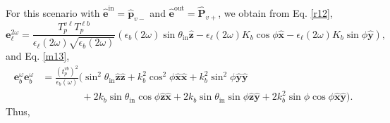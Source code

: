 For this scenario with $\hat{\mathbf{e}}^{\mathrm{in}}=\hat{\mathbf{p}}_{v-}$
and $\hat{\mathbf{e}}^{\mathrm{out}}=\hat{\mathbf{P}}_{v+}$, we obtain from Eq.
\eqref{r12},
\begin{equation*}\label{ri12}
\mathbf{e}^{2\omega}_{\ell} =
\frac{T^{v\ell}_{p}T^{\ell b}_{p}}
     {\epsilon_{\ell}({2\omega})\sqrt{\epsilon_{b}(2\omega)}}
\left(
  \epsilon_{b}(2\omega)\sin\theta_{\mathrm{in}}\hat{\mathbf{z}}
- \epsilon_{\ell}(2\omega)K_{b}\cos\phi\hat{\mathbf{x}}
- \epsilon_{\ell}(2\omega)K_{b}\sin\phi\hat{\mathbf{y}}
\right),
\end{equation*}
and Eq. \eqref{m13},
\begin{equation*}
\begin{split}
\mathbf{e}^{\omega}_{b}\mathbf{e}^{\omega}_{b}
&= \frac{\left(t^{vb}_{p}\right)^{2}}{\epsilon_{b}(\omega)}
\big(
  \sin^{2}\theta_{\mathrm{in}}\hat{\mathbf{z}}\hat{\mathbf{z}}
+ k^{2}_{b}\cos^{2}\phi\hat{\mathbf{x}}\hat{\mathbf{x}}
+ k^{2}_{b}\sin^{2}\phi\hat{\mathbf{y}}\hat{\mathbf{y}}\\
&\qquad\qquad
+ 2k_{b}\sin\theta_{\mathrm{in}}\cos\phi\hat{\mathbf{z}}\hat{\mathbf{x}}
+ 2k_{b}\sin\theta_{\mathrm{in}}\sin\phi\hat{\mathbf{z}}\hat{\mathbf{y}}
+ 2k^{2}_{b}\sin\phi\cos\phi\hat{\mathbf{x}}\hat{\mathbf{y}}
\big).
\end{split}
\end{equation*}
Thus,
